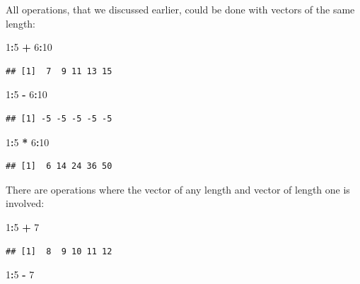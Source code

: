 \documentclass[
]{book}
\newenvironment{Shaded}{\begin{snugshade}}{\end{snugshade}}
\newcommand{\DecValTok}[1]{\textcolor[rgb]{0.00,0.00,0.81}{#1}}
\newcommand{\OperatorTok}[1]{\textcolor[rgb]{0.81,0.36,0.00}{\textbf{#1}}}
\newcommand{\StringTok}[1]{\textcolor[rgb]{0.31,0.60,0.02}{#1}}
\begin{document}
All operations, that we discussed earlier, could be done with vectors of the same length:

\begin{Shaded}
\begin{Highlighting}[]
\DecValTok{1}\OperatorTok{:}\DecValTok{5} \OperatorTok{+}\StringTok{ }\DecValTok{6}\OperatorTok{:}\DecValTok{10}
\end{Highlighting}
\end{Shaded}

\begin{verbatim}
## [1]  7  9 11 13 15
\end{verbatim}

\begin{Shaded}
\begin{Highlighting}[]
\DecValTok{1}\OperatorTok{:}\DecValTok{5} \OperatorTok{-}\StringTok{ }\DecValTok{6}\OperatorTok{:}\DecValTok{10}
\end{Highlighting}
\end{Shaded}

\begin{verbatim}
## [1] -5 -5 -5 -5 -5
\end{verbatim}

\begin{Shaded}
\begin{Highlighting}[]
\DecValTok{1}\OperatorTok{:}\DecValTok{5} \OperatorTok{*}\StringTok{ }\DecValTok{6}\OperatorTok{:}\DecValTok{10}
\end{Highlighting}
\end{Shaded}

\begin{verbatim}
## [1]  6 14 24 36 50
\end{verbatim}

There are operations where the vector of any length and vector of length one is involved:

\begin{Shaded}
\begin{Highlighting}[]
\DecValTok{1}\OperatorTok{:}\DecValTok{5} \OperatorTok{+}\StringTok{ }\DecValTok{7}
\end{Highlighting}
\end{Shaded}

\begin{verbatim}
## [1]  8  9 10 11 12
\end{verbatim}

\begin{Shaded}
\begin{Highlighting}[]
\DecValTok{1}\OperatorTok{:}\DecValTok{5} \OperatorTok{-}\StringTok{ }\DecValTok{7}
\end{Highlighting}
\end{Shaded}
\end{document}
